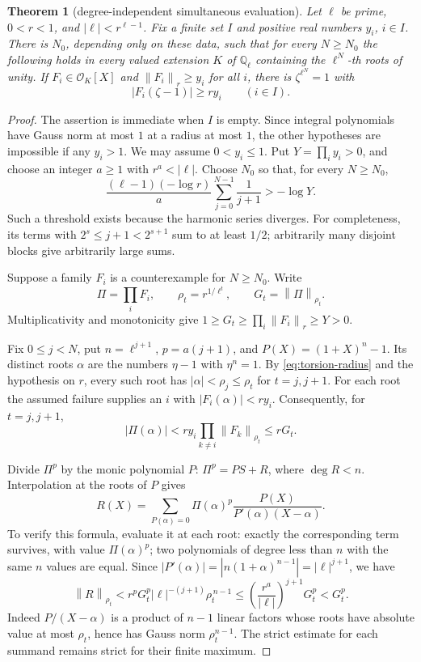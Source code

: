 \documentclass[11pt,a4paper]{article}
\newtheorem{theorem}{Theorem}[section]
\theoremstyle{definition}
\newcommand{\Q}{\mathbb Q}
\newcommand{\vnorm}[1]{\left\lVert#1\right\rVert}
\newcommand{\abs}[1]{\left|#1\right|}
\begin{document}
\begin{theorem}[degree-independent simultaneous evaluation]\label{thm:torsion}
Let \(\ell\) be prime, \(0<r<1\), and \(\abs\ell<r^{\ell-1}\).
Fix a finite set \(I\) and positive real numbers \(y_i\), \(i\in I\).
There is \(N_0\), depending only on these data, such that for every \(N\ge N_0\)
the following holds in every valued extension \(K\) of \(\Q_\ell\) containing
the \(\ell^N\)-th roots of unity. If
\(F_i\in\mathcal O_K[X]\) and \(\vnorm{F_i}_r\ge y_i\) for all \(i\), there is
\(\zeta^{\ell^N}=1\) with
\[
 \abs{F_i(\zeta-1)}\ge r y_i\qquad(i\in I).
\]
\end{theorem}
\begin{proof}
The assertion is immediate when \(I\) is empty. Since integral polynomials have
Gauss norm at most \(1\) at a radius at most \(1\), the other hypotheses are
impossible if any \(y_i>1\). We may assume \(0<y_i\le1\).
Put \(Y=\prod_i y_i>0\), and choose an integer \(a\ge1\) with \(r^a<\abs\ell\).
Choose \(N_0\) so that, for every \(N\ge N_0\),
\begin{equation}\label{eq:harmonic-threshold}
 \frac{(\ell-1)(-\log r)}a\sum_{j=0}^{N-1}\frac1{j+1}>-\log Y .
\end{equation}
Such a threshold exists because the harmonic series diverges. For completeness,
its terms with \(2^s\le j+1<2^{s+1}\) sum to at least \(1/2\);
arbitrarily many disjoint blocks give arbitrarily large sums.

Suppose a family \(F_i\) is a counterexample for \(N\ge N_0\). Write
\[
 \Pi=\prod_iF_i,\qquad
 \rho_t=r^{1/\ell^t},\qquad G_t=\vnorm{\Pi}_{\rho_t}.
\]
Multiplicativity and monotonicity give
\(1\ge G_t\ge\prod_i\vnorm{F_i}_r\ge Y>0\).

Fix \(0\le j<N\), put \(n=\ell^{j+1}\), \(p=a(j+1)\), and
\(P(X)=(1+X)^n-1\). Its distinct roots \(\alpha\) are the numbers \(\eta-1\)
with \(\eta^n=1\). By \eqref{eq:torsion-radius} and the hypothesis on \(r\),
every such root has \(\abs\alpha<\rho_j\le\rho_t\) for \(t=j,j+1\).
For each root the assumed failure supplies an \(i\) with
\(\abs{F_i(\alpha)}<r y_i\). Consequently, for \(t=j,j+1\),
\begin{equation}\label{eq:product-small-at-root}
 \abs{\Pi(\alpha)}<r y_i\prod_{k\ne i}\vnorm{F_k}_{\rho_t}
 \le r G_t .
\end{equation}

Divide \(\Pi^p\) by the monic polynomial \(P\):
\(\Pi^p=PS+R\), where \(\deg R<n\).
Interpolation at the roots of \(P\) gives
\[
 R(X)=\sum_{P(\alpha)=0}\Pi(\alpha)^p
               \frac{P(X)}{P'(\alpha)(X-\alpha)} .
\]
To verify this formula, evaluate it at each root: exactly the corresponding term
survives, with value \(\Pi(\alpha)^p\); two polynomials of degree less than \(n\)
with the same \(n\) values are equal. Since
\(\abs{P'(\alpha)}=\abs{n(1+\alpha)^{n-1}}=\abs\ell^{j+1}\), we have
\[
 \vnorm R_{\rho_t}
 < r^pG_t^p\abs\ell^{-(j+1)}\rho_t^{\,n-1}
 \le \left(\frac{r^a}{\abs\ell}\right)^{j+1}G_t^p
 <G_t^p.
\]
Indeed \(P/(X-\alpha)\) is a product of \(n-1\) linear factors whose roots
have absolute value at most \(\rho_t\), hence has Gauss norm
\(\rho_t^{n-1}\). The strict estimate for each summand remains strict for their
finite maximum.


\end{proof}
\end{document}
